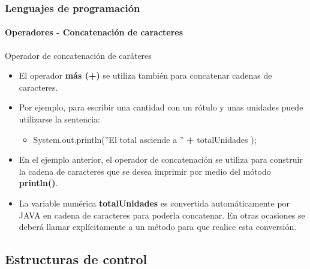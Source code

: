\documentclass{beamer}
\begin{document}
\begin{frame}
  \frametitle{Lenguajes de programación} 
  \framesubtitle{Operadores - Concatenación de caracteres}

  \begin{block}{Operador de concatenación de caráteres}
    \begin{itemize}
    \item El operador \textbf{más (+)} se utiliza también para concatenar cadenas de caracteres.
    \item Por ejemplo, para escribir una cantidad con un rótulo y unas unidades puede utilizarse la sentencia:
      \begin{itemize}
      \item System.out.println(''El total asciende a '' \textbf{+} totalUnidades );
      \end{itemize}
    \item En el ejemplo anterior, el operador de concatenación se utiliza para construir la cadena de caracteres que se desea imprimir por medio del mótodo \textbf{println()}.
    \item La variable numérica \textbf{totalUnidades} es convertida automáticamente por JAVA en cadena de caracteres para poderla concatenar. En otras ocasiones se deberá llamar explícitamente a un método para que realice esta conversión.
    \end{itemize}
  \end{block}
\end{frame}

\subsection{Estructuras de control}
\end{document}
